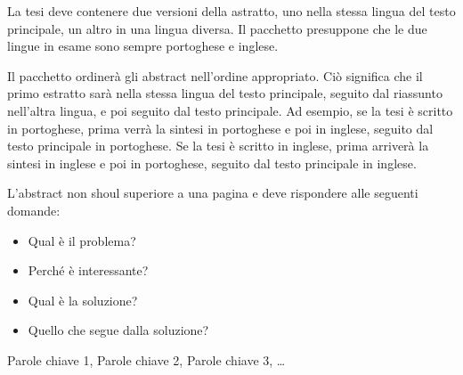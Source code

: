 
%

La tesi deve contenere due versioni della astratto, uno nella stessa lingua del testo principale, un altro in una lingua diversa. Il pacchetto presuppone che le due lingue in esame sono sempre portoghese e inglese.

Il pacchetto ordinerà gli abstract nell'ordine appropriato. Ciò significa che il primo estratto sarà nella stessa lingua del testo principale, seguito dal riassunto nell'altra lingua, e poi seguito dal testo principale. Ad esempio, se la tesi è scritto in portoghese, prima verrà la sintesi in portoghese e poi in inglese, seguito dal testo principale in portoghese. Se la tesi è scritto in inglese, prima arriverà la sintesi in inglese e poi in portoghese, seguito dal testo principale in inglese.

L'abstract non shoul superiore a una pagina e deve rispondere alle seguenti domande:

\begin{itemize}
\item Qual è il problema?
\item Perché è interessante?
\item Qual è la soluzione?
\item Quello che segue dalla soluzione?
\end{itemize}

\begin{keywords}
Parole chiave 1, Parole chiave 2, Parole chiave 3,  \ldots
\end{keywords} 
